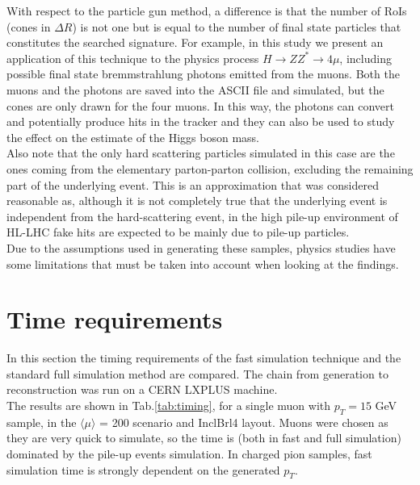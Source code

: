 \documentclass[a4paper,twoside,12pt]{book}
\begin{document}
With respect to the particle gun method, a difference is that the number of RoIs (cones in
$\Delta R$) is not one but is equal to the number of final state particles that constitutes the
searched signature. For example,
in this study we present an application of this technique to the physics process
$H \rightarrow ZZ^* \rightarrow 4\mu$, including possible final state bremmstrahlung photons emitted from the muons. Both the muons and the photons are saved into the 
ASCII file and simulated, but the cones are only drawn for the four muons. In this way, the photons can convert and potentially produce hits in the
tracker and they can also be used to study the effect on the estimate of the Higgs boson mass.\\

Also note that the only hard scattering particles simulated in this case are the ones coming from
the elementary parton-parton collision, excluding the remaining part of the underlying event. This
is an approximation that was considered reasonable as, although it is not completely
true that the underlying event is independent from the hard-scattering event, in the high pile-up
environment of HL-LHC fake hits are expected to be mainly due to pile-up particles. \\

Due to the assumptions used in generating these samples, physics studies have some limitations that must be taken into
account when looking at the findings.

\section{Time requirements}

In this section the timing requirements of the fast simulation technique and the
standard full simulation method are compared.
The chain from generation to reconstruction was run on a 
CERN LXPLUS machine. \\

The results are shown in Tab.\ref{tab:timing}, for a single muon with $p_{T} = 15$ GeV sample,
in the $\langle\mu\rangle$ = 200 scenario and InclBrl4 layout. Muons were chosen as 
they are very quick to simulate, so the time is (both in fast and full simulation) 
dominated by the pile-up events simulation. In charged pion samples, fast simulation time is strongly 
dependent on the generated $p_{T}$.
\end{document}
